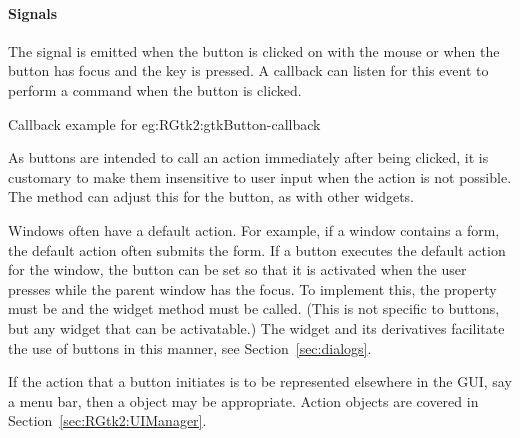 \paragraph{Signals}

The  signal is emitted when the button is
clicked on with the mouse or when the button has focus and the
 key is pressed. A callback can listen for this event to
perform a command when the button is clicked.  

\begin{example}{Callback example for
    }{eg:RGtk2:gtkButton-callback}

\begin{Schunk}
\end{Schunk}
\end{example}

As buttons are intended to call an action immediately after being
clicked, it is customary to make them insensitive to user input when
the action is not possible. The 
method can adjust this for the button, as with other widgets.

Windows often have a default action. For example, if a window contains
a form, the default action often submits the form. If a button
executes the default action for the window, the button can be
set so that it is activated when the user presses  while
the parent window has the focus. To implement this, the property
 must be  and the widget method
 must be called. (This is not specific
to buttons, but any widget that can be activatable.) The
 widget and its derivatives facilitate the use of
buttons in this manner, see Section~\ref{sec:dialogs}.

If the action that a button initiates is to be represented elsewhere
in the GUI, say a menu bar, then a  object may be
appropriate. Action objects are covered in
Section~\ref{sec:RGtk2:UIManager}.


